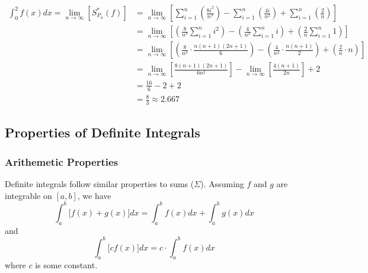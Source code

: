\documentclass[10pt]{article}
\begin{document}
$$
    \begin{aligned}
        \int_0^2f(x)dx=\lim_{n\to\infty}\left[S_{P_n}^*(f)\right] & =\lim_{n\to\infty}\left[\sum_{i=1}^n\left(\frac{8i^2}{n^3}\right)-\sum_{i=1}^n\left(\frac{4i}{n^2}\right)+\sum_{i=1}^n\left(\frac{2}{n}\right)\right] \\
                                                                  & =\lim_{n\to\infty}\left[
            \left(\frac{8}{n^3}\sum_{i=1}^ni^2\right) -
            \left(\frac{4}{n^2}\sum_{i=1}^ni\right) +
            \left(\frac{2}{n}\sum_{i=1}^n1\right)
        \right]                                                                                                                                                                                                           \\
                                                                  & =\lim_{n\to\infty}\left[
            \left(\frac{8}{n^3}\cdot\frac{n(n+1)(2n+1)}{6}\right) -
            \left(\frac{4}{n^2}\cdot\frac{n(n+1)}{2}\right) +
            \left(\frac{2}{n}\cdot n\right)
        \right]                                                                                                                                                                                                           \\
                                                                  & =\lim_{n\to\infty}\left[\frac{8(n+1)(2n+1)}{6n^2}\right]-\lim_{n\to\infty}\left[\frac{4(n+1)}{2n}\right]+2                                            \\
                                                                  & =\frac{16}{6}-2+2                                                                                                                                     \\
                                                                  & =\frac{8}{3}\approx2.667
    \end{aligned}
$$
\newpage
\subsection{Properties of Definite Integrals}
\subsubsection{Arithemetic Properties}
Definite integrals follow similar properties to sums ($\Sigma$). Assuming $f$ and $g$ are integrable on $[a,b]$, we have
$$
    \int_a^b\big[f(x)+g(x)\big]dx=\int_a^bf(x)dx+\int_a^bg(x)dx
$$
and
$$
    \int_a^b\big[cf(x)\big]dx=c\cdot\int_a^bf(x)dx
$$
where $c$ is some constant.
\end{document}
